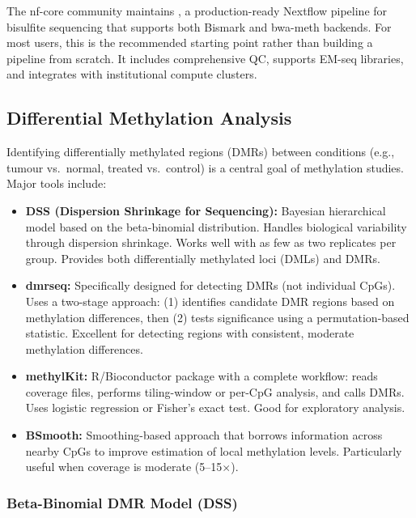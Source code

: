 \begin{tipbox}
The nf-core community maintains , a production-ready Nextflow pipeline for bisulfite sequencing that supports both Bismark and bwa-meth backends. For most users, this is the recommended starting point rather than building a pipeline from scratch. It includes comprehensive QC, supports EM-seq libraries, and integrates with institutional compute clusters.
\end{tipbox}

\subsection{Differential Methylation Analysis}
\label{subsec:methylation:dmr}

Identifying differentially methylated regions (DMRs) between conditions (e.g., tumour vs.\ normal, treated vs.\ control) is a central goal of methylation studies. Major tools include:

\begin{itemize}[itemsep=3pt]
  \item \textbf{DSS (Dispersion Shrinkage for Sequencing):} Bayesian hierarchical model based on the beta-binomial distribution. Handles biological variability through dispersion shrinkage. Works well with as few as two replicates per group. Provides both differentially methylated loci (DMLs) and DMRs.
  \item \textbf{dmrseq:} Specifically designed for detecting DMRs (not individual CpGs). Uses a two-stage approach: (1) identifies candidate DMR regions based on methylation differences, then (2) tests significance using a permutation-based statistic. Excellent for detecting regions with consistent, moderate methylation differences.
  \item \textbf{methylKit:} R/Bioconductor package with a complete workflow: reads coverage files, performs tiling-window or per-CpG analysis, and calls DMRs. Uses logistic regression or Fisher's exact test. Good for exploratory analysis.
  \item \textbf{BSmooth:} Smoothing-based approach that borrows information across nearby CpGs to improve estimation of local methylation levels. Particularly useful when coverage is moderate (5--15$\times$).
\end{itemize}

\subsubsection{Beta-Binomial DMR Model (DSS)}
\label{subsubsec:methylation:dss-model}

